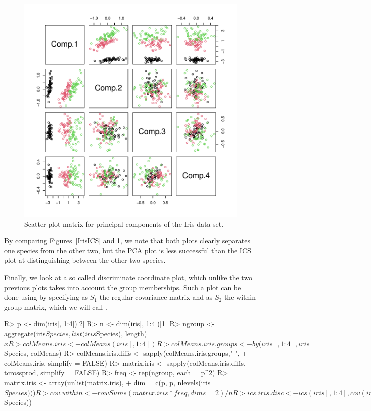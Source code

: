 \documentclass[article,nojss]{jss}
\begin{document}
\begin{figure}[t]
\begin{center}
\includegraphics{ICS-017}
\caption{Scatter plot matrix for principal components of the Iris data set.}
\label{IrisPP}
\end{center}
\end{figure}

By comparing Figures~\ref{IrisICS} and \ref{IrisPP}, we note that both plots clearly separates one
species from the other two, but the {PCA} plot is less successful than the {ICS} plot at distinguishing
between the other two species.

Finally, we look at a so called discriminate coordinate plot, which unlike the two previous plots takes into account
the group memberships. Such a plot can be done using  by specifying as $S_1$ the regular covariance matrix
and as $S_2$ the within group matrix, which we will call .
\begin{Schunk}
\begin{Sinput}
R> p <- dim(iris[, 1:4])[2]
R> n <- dim(iris[, 1:4])[1]
R> ngroup <- aggregate(iris$Species, list(iris$Species), length)$x
R> colMeans.iris <- colMeans(iris[, 1:4])
R> colMeans.iris.groups <- by(iris[, 1:4], iris$Species, colMeans)
R> colMeans.iris.diffs <- sapply(colMeans.iris.groups,"-",
+  colMeans.iris, simplify = FALSE)
R> matrix.iris <- sapply(colMeans.iris.diffs, tcrossprod, simplify = FALSE)
R> freq <- rep(ngroup, each = p^2)
R> matrix.iris <- array(unlist(matrix.iris),
+    dim = c(p, p, nlevels(iris$Species)))
R> cov.within <- rowSums(matrix.iris * freq, dims = 2)/n
R> ics.iris.disc <- ics(iris[,1:4], cov(iris[,1:4]), cov.within)
R> plot(ics.iris.disc, col = as.numeric(iris$Species))
\end{Sinput}
\end{Schunk}
\end{document}
